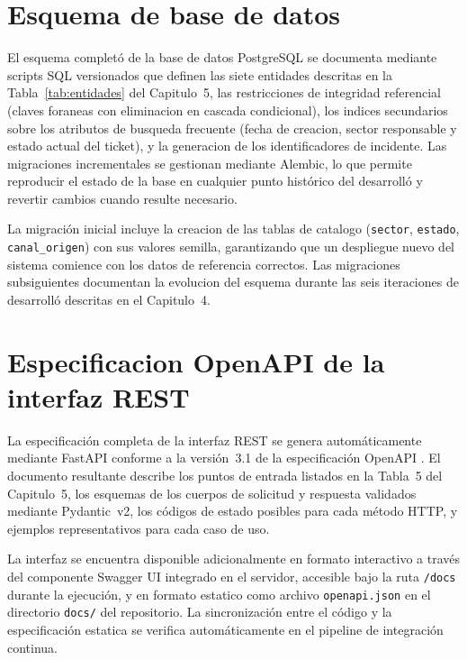 \section{Esquema de base de datos}

El esquema completó de la base de datos PostgreSQL se documenta mediante scripts SQL versionados que definen las siete entidades descritas en la Tabla~\ref{tab:entidades} del Capitulo~5, las restricciones de integridad referencial (claves foraneas con eliminacion en cascada condicional), los indices secundarios sobre los atributos de busqueda frecuente (fecha de creacion, sector responsable y estado actual del ticket), y la generacion de los identificadores de incidente. Las migraciones incrementales se gestionan mediante Alembic, lo que permite reproducir el estado de la base en cualquier punto histórico del desarrolló y revertir cambios cuando resulte necesario.

La migración inicial incluye la creacion de las tablas de catalogo (\texttt{sector}, \texttt{estado}, \texttt{canal\_origen}) con sus valores semilla, garantizando que un despliegue nuevo del sistema comience con los datos de referencia correctos. Las migraciones subsiguientes documentan la evolucion del esquema durante las seis iteraciones de desarrolló descritas en el Capitulo~4.

\section{Especificacion OpenAPI de la interfaz REST}

La especificación completa de la interfaz REST se genera automáticamente mediante FastAPI conforme a la versión~3.1 de la especificación OpenAPI \parencite{Tiangolo2024_fastapi}. El documento resultante describe los puntos de entrada listados en la Tabla~5 del Capitulo~5, los esquemas de los cuerpos de solicitud y respuesta validados mediante Pydantic~v2, los códigos de estado posibles para cada método HTTP, y ejemplos representativos para cada caso de uso.

La interfaz se encuentra disponible adicionalmente en formato interactivo a través del componente Swagger UI integrado en el servidor, accesible bajo la ruta \texttt{/docs} durante la ejecución, y en formato estatico como archivo \texttt{openapi.json} en el directorio \texttt{docs/} del repositorio. La sincronización entre el código y la especificación estatica se verifica automáticamente en el pipeline de integración continua.

